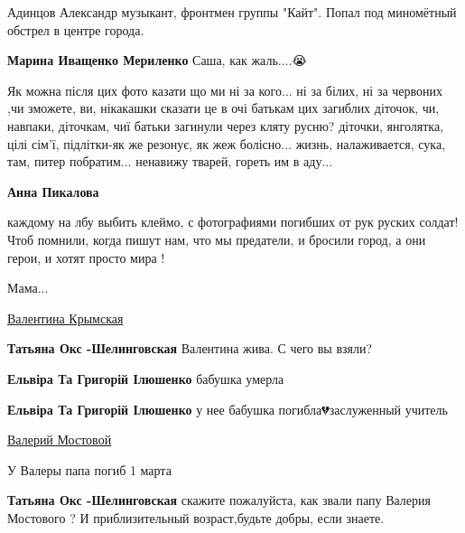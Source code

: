 \begin{multicols}{2}
\begin{itemize}
\begin{itemize} %
Адинцов Александр музыкант, фронтмен группы "Кайт". Попал под миномётный обстрел в центре города.

\textbf{Марина Иващенко Мериленко} Саша, как жаль....😭
\end{itemize} %


Як можна після цих фото казати що ми ні за кого... ні за білих, ні за червоних
,чи зможете, ви, нікакашки сказати це в очі батькам цих загиблих
діточок, чи, навпаки, діточкам, чиї батьки загинули через кляту
русню? діточки, янголятка, цілі сім'ї, підлітки-як же резонує, як жеж
болісно... жизнь, налаживается, сука, там, питер побратим... ненавижу тварей, гореть
им в аду...

\begin{itemize} %
\textbf{Анна Пикалова} 

каждому на лбу выбить клеймо, с фотографиями погибших от рук руских солдат!
Чтоб помнили, когда пишут нам, что мы предатели, и бросили город, а они
герои, и хотят просто мира !

\end{itemize} %


Мама...


\href{https://www.facebook.com/profile.php?id=100017497327694}{Валентина Крымская}

\begin{itemize} %
\textbf{Татьяна Окс -Шелинговская} Валентина жива. С чего вы взяли?

\textbf{Ельвіра Та Григорій Ілюшенко} бабушка умерла

\textbf{Ельвіра Та Григорій Ілюшенко} у нее бабушка погибла💔заслуженный учитель
\end{itemize} %


\href{https://www.facebook.com/profile.php?id=100009499191122}{Валерий Мостовой}

\begin{itemize} %

У Валеры папа погиб 1 марта

\textbf{Татьяна Окс -Шелинговская} скажите пожалуйста, как звали папу Валерия Мостового ? И приблизительный возраст,будьте добры, если знаете.
\end{itemize} %


\end{itemize}
\end{multicols}
